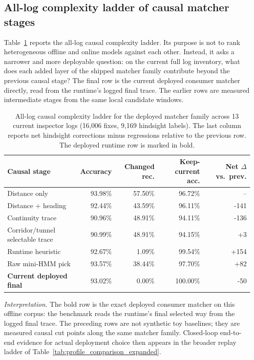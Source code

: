 \documentclass{article}
\begin{document}
\subsection{All-log complexity ladder of causal matcher stages}
Table~\ref{tab:model_benchmark} reports the all-log causal complexity ladder. Its purpose is not to rank heterogeneous offline and online models against each other. Instead, it asks a narrower and more deployable question: on the current full log inventory, what does each added layer of the shipped matcher family contribute beyond the previous causal stage? The final row is the current deployed consumer matcher directly, read from the runtime's logged final trace. The earlier rows are measured intermediate stages from the same local candidate windows.

\begin{table}[!htbp]
\centering
\scriptsize
\caption{All-log causal complexity ladder for the deployed matcher family across 13 current inspector logs (16{,}006 fixes, 9{,}169 hindsight labels). The last column reports net hindsight corrections minus regressions relative to the previous row. The deployed runtime row is marked in bold.}
\label{tab:model_benchmark}
\begin{tabular}{p{4.1cm}rrrr}
\toprule
Causal stage & Accuracy & Changed rec. & Keep-current acc. & Net \(\Delta\) vs.\ prev. \\
\midrule
Distance only & 93.98\% & 57.50\% & 96.72\% & -- \\
Distance + heading & 92.44\% & 43.59\% & 96.11\% & -141 \\
Continuity trace & 90.96\% & 48.91\% & 94.11\% & -136 \\
Corridor/tunnel selectable trace & 90.99\% & 48.91\% & 94.15\% & +3 \\
Runtime heuristic & 92.67\% & 1.09\% & 99.54\% & +154 \\
Raw mini-HMM pick & 93.57\% & 38.44\% & 97.70\% & +82 \\
\textbf{Current deployed final} & 93.02\% & 0.00\% & 100.00\% & -50 \\
\bottomrule
\end{tabular}
\end{table}

\noindent
\textit{Interpretation.} The bold row is the exact deployed consumer matcher on this offline corpus: the benchmark reads the runtime's final selected way from the logged final trace. The preceding rows are not synthetic toy baselines; they are measured causal cut points along the same matcher family. Closed-loop end-to-end evidence for actual deployment choice then appears in the broader replay ladder of Table~\ref{tab:profile_comparison_expanded}.
\end{document}
